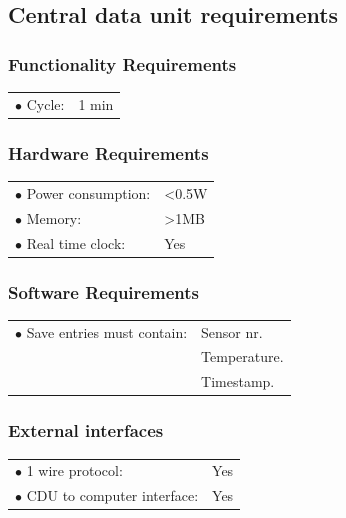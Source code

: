 \subsection{Central data unit requirements}

\subsubsection{Functionality Requirements}
\begin{table}[H]
\begin{tabular}{p{8cm} p{2cm}}
$\bullet$ Cycle\footnotemark: & 1 min\\
\end{tabular}
\end{table}
\subsubsection{Hardware Requirements}
\begin{table}[H]
\begin{tabular}{p{8cm} p{2cm}}
$\bullet$ Power consumption: & <0.5W \footnotemark \\
$\bullet$ Memory: & >1MB\footnotemark\\
$\bullet$ Real time clock: & Yes\\
\end{tabular}
\end{table}

\subsubsection{Software Requirements}
\begin{table}[H]
\begin{tabular}{p{8cm} p{2cm}}
$\bullet$ Save entries must contain: &Sensor nr. \\
~ 									&Temperature. \\
~									&Timestamp. \\


\end{tabular}
\end{table}


\subsubsection{External interfaces}
\begin{table}[H]
\begin{tabular}{p{8cm} p{2cm}}
$\bullet$ 1 wire protocol: & Yes\\
$\bullet$ CDU to computer interface: & Yes\\
\end{tabular}
\end{table}

